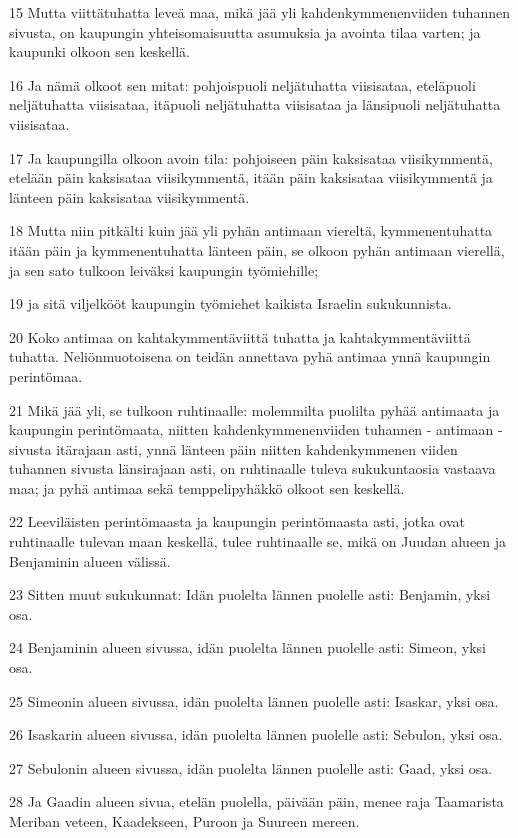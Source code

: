\par 15 Mutta viittätuhatta leveä maa, mikä jää yli kahdenkymmenenviiden tuhannen sivusta, on kaupungin yhteisomaisuutta asumuksia ja avointa tilaa varten; ja kaupunki olkoon sen keskellä.
\par 16 Ja nämä olkoot sen mitat: pohjoispuoli neljätuhatta viisisataa, eteläpuoli neljätuhatta viisisataa, itäpuoli neljätuhatta viisisataa ja länsipuoli neljätuhatta viisisataa.
\par 17 Ja kaupungilla olkoon avoin tila: pohjoiseen päin kaksisataa viisikymmentä, etelään päin kaksisataa viisikymmentä, itään päin kaksisataa viisikymmentä ja länteen päin kaksisataa viisikymmentä.
\par 18 Mutta niin pitkälti kuin jää yli pyhän antimaan viereltä, kymmenentuhatta itään päin ja kymmenentuhatta länteen päin, se olkoon pyhän antimaan vierellä, ja sen sato tulkoon leiväksi kaupungin työmiehille;
\par 19 ja sitä viljelkööt kaupungin työmiehet kaikista Israelin sukukunnista.
\par 20 Koko antimaa on kahtakymmentäviittä tuhatta ja kahtakymmentäviittä tuhatta. Neliönmuotoisena on teidän annettava pyhä antimaa ynnä kaupungin perintömaa.
\par 21 Mikä jää yli, se tulkoon ruhtinaalle: molemmilta puolilta pyhää antimaata ja kaupungin perintömaata, niitten kahdenkymmenenviiden tuhannen - antimaan - sivusta itärajaan asti, ynnä länteen päin niitten kahdenkymmenen viiden tuhannen sivusta länsirajaan asti, on ruhtinaalle tuleva sukukuntaosia vastaava maa; ja pyhä antimaa sekä temppelipyhäkkö olkoot sen keskellä.
\par 22 Leeviläisten perintömaasta ja kaupungin perintömaasta asti, jotka ovat ruhtinaalle tulevan maan keskellä, tulee ruhtinaalle se, mikä on Juudan alueen ja Benjaminin alueen välissä.
\par 23 Sitten muut sukukunnat: Idän puolelta lännen puolelle asti: Benjamin, yksi osa.
\par 24 Benjaminin alueen sivussa, idän puolelta lännen puolelle asti: Simeon, yksi osa.
\par 25 Simeonin alueen sivussa, idän puolelta lännen puolelle asti: Isaskar, yksi osa.
\par 26 Isaskarin alueen sivussa, idän puolelta lännen puolelle asti: Sebulon, yksi osa.
\par 27 Sebulonin alueen sivussa, idän puolelta lännen puolelle asti: Gaad, yksi osa.
\par 28 Ja Gaadin alueen sivua, etelän puolella, päivään päin, menee raja Taamarista Meriban veteen, Kaadekseen, Puroon ja Suureen mereen.
